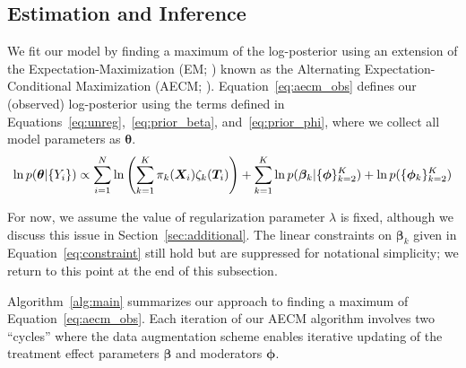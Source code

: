 \subsection{Estimation and Inference}

We fit our model by finding a maximum of the log-posterior using an
extension of the Expectation-Maximization (EM;
\citealt{demp:lair:rubi:77}) known as the Alternating
Expectation-Conditional Maximization (AECM;
\citealt{meng:vand:97}). Equation~\eqref{eq:aecm_obs} defines our
(observed) log-posterior using the terms defined in
Equations~\eqref{eq:unreg},~\eqref{eq:prior_beta},
and~\eqref{eq:prior_phi}, where we collect all model parameters as
$\bm{\theta}$.
\begin{equation}
\label{eq:aecm_obs}
\ln p(\bm{\theta} | \{Y_i\}) \propto \sum_{i=1}^N \ln\left(\sum_{k=1}^K \pi_{k}(\bm{X}_i) \zeta_k(\bm{T}_i)\right) + \sum_{k=1}^K \ln p(\bm{\beta}_k | \{\bm{\phi}\}_{k=2}^K) + \ln p(\{\bm{\phi}_k\}_{k=2}^K)
\end{equation}

For now, we assume the value of regularization parameter $\lambda$ is
fixed, although we discuss this issue in
Section~\ref{sec:additional}. The linear constraints on $\bm{\beta}_k$
given in Equation~\eqref{eq:constraint} still hold but are suppressed
for notational simplicity; we return to this point at the end of this
subsection.

Algorithm~\ref{alg:main} summarizes our approach to finding a maximum
of Equation~\eqref{eq:aecm_obs}.  Each iteration of our AECM algorithm
involves two ``cycles'' where the data augmentation scheme enables
iterative updating of the treatment effect parameters $\bm{\beta}$ and
moderators $\bm{\phi}$.

